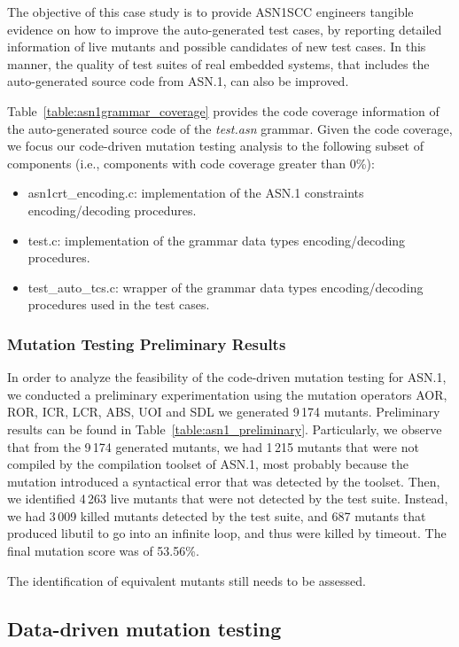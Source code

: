 The objective of this case study is to provide ASN1SCC engineers tangible evidence on how to improve the auto-generated test cases, by reporting detailed information of live mutants and possible candidates of new test cases. In this manner, the quality of test suites of real embedded systems, that includes the auto-generated source code from ASN.1, can also be improved.

Table~\ref{table:asn1grammar_coverage} provides the code coverage information of the auto-generated source code of the \emph{test.asn} grammar. Given the code coverage, we focus our code-driven mutation testing analysis to the following subset of components (i.e., components with code coverage greater than 0\%):

\begin{itemize}
	\item asn1crt\_encoding.c: implementation of the ASN.1 constraints encoding/decoding procedures.
	\item test.c: implementation of the grammar data types encoding/decoding procedures.
	\item test\_auto\_tcs.c: wrapper of the grammar data types encoding/decoding procedures used in the test cases.
\end{itemize}

\subsubsection{Mutation Testing Preliminary Results}



In order to analyze the feasibility of the code-driven mutation testing for ASN.1, we conducted a preliminary experimentation using the mutation operators AOR, ROR, ICR, LCR, ABS, UOI and SDL we generated 9\,174 mutants. Preliminary results can be found in Table~\ref{table:asn1_preliminary}.
Particularly, we observe that from the 9\,174 generated mutants, we had 1\,215 mutants that were not compiled by the compilation toolset of ASN.1, most probably because the mutation introduced a syntactical error that was detected by the toolset.
Then, we identified 4\,263 live mutants that were not detected by the test suite. Instead, we had 3\,009 killed mutants detected by the test suite, and 687 mutants that produced libutil to go into an infinite loop, and thus were killed by timeout. The final mutation score was of 53.56\%.

The identification of equivalent mutants still needs to be assessed.


\subsection{Data-driven mutation testing}








